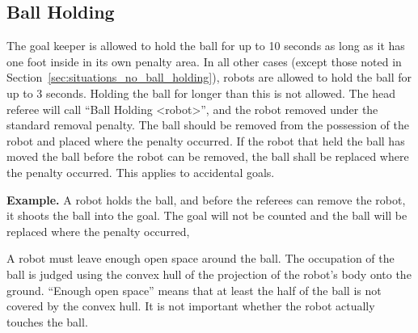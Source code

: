 \documentclass[12pt]{article}
\begin{document}
\subsection{Ball Holding}
\label{sec:ball_holding}

The goal keeper is allowed to hold the ball for up to 10 seconds as long as it has one foot inside in its own penalty area.  In all other cases (except those noted in Section~\ref{sec:situations_no_ball_holding}), robots are allowed to hold the ball for up to 3 seconds. Holding the ball for longer than this is not allowed.
The head referee will call ``Ball Holding \textless robot\textgreater'', and the robot removed under the standard removal penalty.
The ball should be removed from the possession of the robot and placed where the penalty occurred.
If the robot that held the ball has moved the ball before the robot can be removed, the ball shall be replaced where the penalty occurred.
This applies to accidental goals.

\textbf{Example.} A robot holds the ball, and before the referees can remove the robot, it shoots the ball into the goal. The goal will not be counted and the ball will be replaced where the penalty occurred,

A robot must leave enough open space around the ball.
The occupation of the ball is judged using the convex hull of the projection of the robot's body onto the ground. ``Enough open space'' means that at least the half of the ball is not covered by the convex hull. It is not important whether the robot actually touches the ball.
\end{document}
